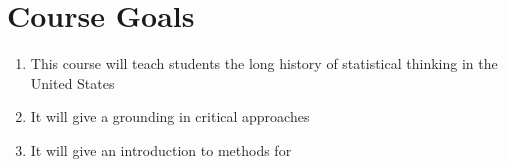 \section{Course Goals}

\begin{enumerate}
\def\labelenumi{\arabic{enumi}.}
\itemsep1pt\parskip0pt
\item
  This course will teach students the long history of statistical
  thinking in the United States
\item
  It will give a grounding in critical approaches
\item
  It will give an introduction to methods for
\end{enumerate}
